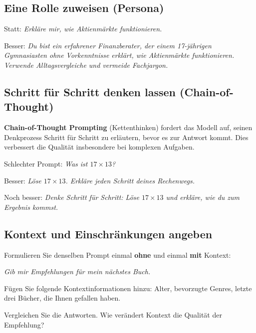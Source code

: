 \subsection{Eine Rolle zuweisen (Persona)}

\begin{myexample}
Statt: \textit{Erkläre mir, wie Aktienmärkte funktionieren.}

Besser: \textit{Du bist ein erfahrener Finanzberater, der einem 17-jährigen
Gymnasiasten ohne Vorkenntnisse erklärt, wie Aktienmärkte funktionieren.
Verwende Alltagsvergleiche und vermeide Fachjargon.}
\end{myexample}

\subsection{Schritt für Schritt denken lassen (Chain-of-Thought)}

\begin{mydefinition}
\textbf{Chain-of-Thought Prompting} (Kettenthinken) fordert das Modell auf,
seinen Denkprozess Schritt für Schritt zu erläutern, bevor es zur Antwort kommt.
Dies verbessert die Qualität insbesondere bei komplexen Aufgaben.
\end{mydefinition}

\begin{myexample}
Schlechter Prompt: \textit{Was ist $17 \times 13$?}

Besser: \textit{Löse $17 \times 13$. Erkläre jeden Schritt deines Rechenwegs.}

Noch besser: \textit{Denke Schritt für Schritt: Löse $17 \times 13$ und
erkläre, wie du zum Ergebnis kommst.}
\end{myexample}

\subsection{Kontext und Einschränkungen angeben}

\begin{myexercise}
Formulieren Sie denselben Prompt einmal \textbf{ohne} und einmal
\textbf{mit} Kontext:

\textit{Gib mir Empfehlungen für mein nächstes Buch.}

Fügen Sie folgende Kontextinformationen hinzu: Alter, bevorzugte Genres,
letzte drei Bücher, die Ihnen gefallen haben.

Vergleichen Sie die Antworten. Wie verändert Kontext die Qualität der Empfehlung?
\end{myexercise}

